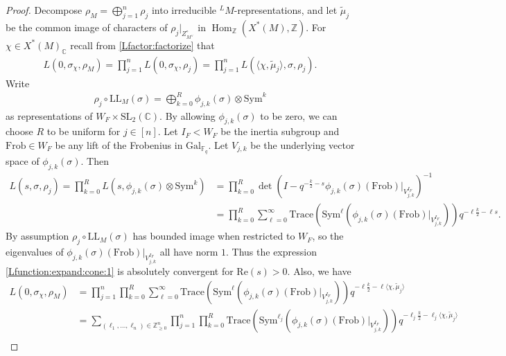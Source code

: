\documentclass[10pt]{amsart}
\theoremstyle{definition}
\numberwithin{equation}{section}
\DeclareMathOperator{\Hom}{\mathrm{Hom}}
\numberwithin{equation}{subsection}
\newcommand{\ZZ}{\mathbb{Z}}
\newcommand{\CC}{\mathbb{C}}
\begin{document}
\begin{proof} Decompose $\rho_M = \bigoplus\limits_{j=1}^n\rho_j$ into irreducible $^LM$-representations, and let $\widetilde{\mu}_j$ be the common image of characters of $\rho_j|_{Z_{M^\lor}^\circ}$ in $\Hom_\ZZ(X^*(M),\ZZ)$. For $\chi\in X^*(M)_\CC$ recall from \eqref{Lfactor:factorize} that
\begin{align*}
    L(0,\sigma_\chi,\rho_M) = \prod_{j=1}^n L(0,\sigma_\chi,\rho_j) = \prod_{j=1}^n L(\langle\chi,\widetilde{\mu}_j\rangle,\sigma,\rho_j).
\end{align*}
 Write
\begin{align*}
    \rho_j\circ \mathrm{LL}_M(\sigma) = \bigoplus_{k=0}^R \phi_{j,k}(\sigma) \otimes\mathrm{Sym}^k 
\end{align*}
as representations of $W_F\times\mathrm{SL}_2(\CC)$. By allowing $\phi_{j,k}(\sigma)$ to be zero, we can choose $R$ to be uniform for $j\in[n]$. Let $I_F< W_F$ be the inertia subgroup and $\mathrm{Frob}\in W_F$ be any lift of the Frobenius in $\mathrm{Gal}_{\mathbb{F}_q}.$ Let $V_{j,k}$ be the underlying vector space of $\phi_{j,k}(\sigma)$. Then
\begin{align}\label{Lfunction:expand:cone:1}
    \nonumber L(s,\sigma,\rho_j) = \prod_{k=0}^R L(s,\phi_{j,k}(\sigma) \otimes\mathrm{Sym}^k) &= \prod_{k=0}^R \det\left(I - q^{-\frac{k}{2}-s}\phi_{j,k}(\sigma)(\mathrm{Frob})\big|_{V_{j,k}^{I_F}}\right)^{-1}\\
    &=\prod_{k=0}^R \sum_{\ell=0}^\infty \mathrm{Trace}\left(\mathrm{Sym}^\ell\left(\phi_{j,k}(\sigma)(\mathrm{Frob})\big|_{V_{j,k}^{I_F}}\right)\right)q^{-\ell\frac{k}{2}-\ell s}.
\end{align}
By assumption $\rho_j\circ \mathrm{LL}_M(\sigma)$ has bounded image when restricted to $W_F$, so the eigenvalues of $\phi_{j,k}(\sigma)(\mathrm{Frob})\big|_{V_{j,k}^{I_F}}$ all have norm $1$. Thus the expression \eqref{Lfunction:expand:cone:1} is absolutely convergent for $\mathrm{Re}(s)>0$. Also, we have
\begin{align}\label{eq:Lexpansion}
   \nonumber  L(0,\sigma_\chi,\rho_M) &= \prod_{j=1}^n\prod_{k=0}^R\sum_{\ell=0}^\infty  \mathrm{Trace}\left(\mathrm{Sym}^\ell\left(\phi_{j,k}(\sigma)(\mathrm{Frob})\big|_{V_{j,k}^{I_F}}\right)\right)q^{-\ell\frac{k}{2}-\ell \langle\chi,\widetilde{\mu}_j\rangle}\\
    \nonumber &=\sum_{(\ell_1,\ldots,\ell_n)\in\mathbb{Z}_{\geq 0}^n}\prod_{j=1}^n\prod_{k=0}^R  \mathrm{Trace}\left(\mathrm{Sym}^{\ell_j}\left(\phi_{j,k}(\sigma)(\mathrm{Frob})\big|_{V_{j,k}^{I_F}}\right)\right)q^{-\ell_j\frac{k}{2}-\ell_j \langle\chi,\widetilde{\mu}_j\rangle}\\

\end{align}
\end{proof}
\end{document}
